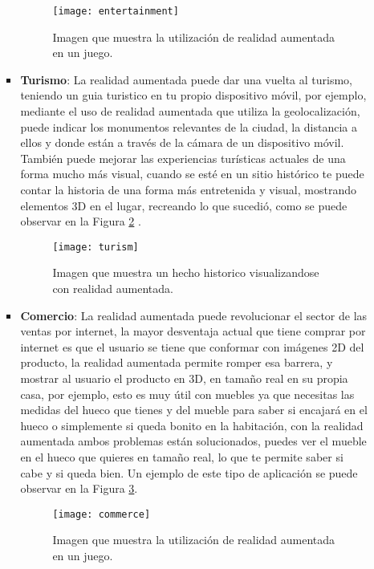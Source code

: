 \begin{itemize}
\begin{itemize}
\begin{itemize}
  \begin{figure}[h]
    \centering
    \texttt{[image: entertainment]}
    \caption{Imagen que muestra la utilización de realidad aumentada en un juego.\protect\footnotemark}
    \label{figura-entretenimiento}
  \end{figure}


  \item \textbf{Turismo}: La realidad aumentada puede dar una vuelta al turismo, teniendo un guia turistico en tu propio dispositivo móvil, por ejemplo, mediante el uso de realidad aumentada que utiliza la geolocalización, puede indicar los monumentos relevantes de la ciudad, la distancia a ellos y donde están a través de la cámara de un dispositivo móvil. También puede mejorar las experiencias turísticas actuales de una forma mucho más visual, cuando se esté en un sitio histórico te puede contar la historia de una forma más entretenida y visual, mostrando elementos 3D en el lugar, recreando lo que sucedió, como se puede observar en la Figura \ref{figura-turismo} \cite{reinoso}.

  \begin{figure}[h]
    \centering
    \texttt{[image: turism]}
    \caption{Imagen que muestra un hecho historico visualizandose con realidad aumentada. \cite{layar}}
    \label{figura-turismo}
  \end{figure}

  \newpage

  \item \textbf{Comercio}: La realidad aumentada puede revolucionar el sector de las ventas por internet, la mayor desventaja actual que tiene comprar por internet es que el usuario se tiene que conformar con imágenes 2D del producto, la realidad aumentada permite romper esa barrera, y mostrar al usuario el producto en 3D, en tamaño real en su propia casa, por ejemplo, esto es muy útil con muebles ya que necesitas las medidas del hueco que tienes y del mueble para saber si encajará en el hueco o simplemente si queda bonito en la habitación, con la realidad aumentada ambos problemas están solucionados, puedes ver el mueble en el hueco que quieres en tamaño real, lo que te permite saber si cabe y si queda bien. Un ejemplo de este tipo de aplicación se puede observar en la Figura \ref{figura-comercio}.

  \begin{figure}
    \centering
    \texttt{[image: commerce]}
    \caption{Imagen que muestra la utilización de realidad aumentada en un juego.\protect\footnotemark}
    \label{figura-comercio}
  \end{figure}


\end{itemize}
\end{itemize}
\end{itemize}
